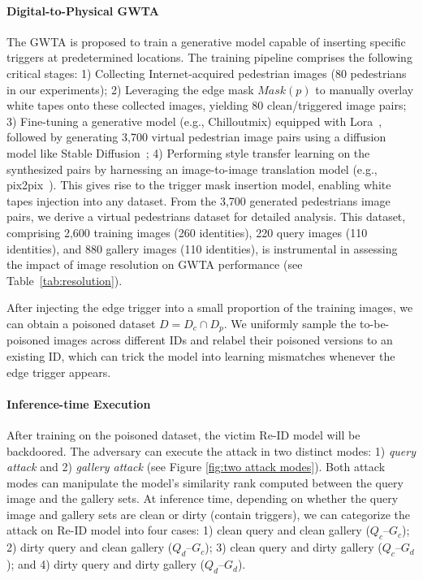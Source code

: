 \documentclass[sigconf,authordraft]{acmart}
\begin{document}
\paragraph{Digital-to-Physical GWTA} The GWTA is proposed to train a generative model capable of inserting specific triggers at predetermined locations. The training pipeline comprises the following critical stages: 1) Collecting Internet-acquired pedestrian images (80 pedestrians in our experiments); 2) Leveraging the edge mask $Mask(p)$ to manually overlay white tapes onto these collected images, yielding 80 clean/triggered image pairs; 3) Fine-tuning a generative model (e.g., Chilloutmix) equipped with Lora~\cite{hu2021lora}, followed by generating 3,700 virtual pedestrian image pairs using a diffusion model like Stable Diffusion~\cite{rombach2022high}; 4) Performing style transfer learning on the synthesized pairs by harnessing an image-to-image translation model (e.g., pix2pix~\cite{isola2017image}).
This gives rise to the trigger mask insertion model, enabling white tapes injection into any dataset. From the 3,700 generated pedestrians image pairs, we derive a virtual pedestrians dataset for detailed analysis. This dataset, comprising 2,600 training images (260 identities), 220 query images (110 identities), and 880 gallery images (110 identities), is instrumental in assessing the impact of image resolution on GWTA performance (see Table~\ref{tab:resolution}).

After injecting the edge trigger into a small proportion of the training images, we can obtain a poisoned dataset $D=D_c \cap D_p$. We uniformly sample the to-be-poisoned images across different IDs and relabel their poisoned versions to an existing ID, which can trick the model into learning mismatches whenever the edge trigger appears.

\paragraph{Inference-time Execution}
After training on the poisoned dataset, the victim Re-ID model will be backdoored. The adversary can execute the attack in two distinct modes: 1) \emph{query attack} and 2) \emph{gallery attack} (see Figure \ref{fig:two attack modes}). 
Both attack modes can manipulate the model's similarity rank computed between the query image and the gallery sets. At inference time, depending on whether the query image and gallery sets are clean or dirty (contain triggers), we can categorize the attack on Re-ID model into four cases:
1) clean query and clean gallery ($Q_{c}$--$G_{c}$); 2) dirty query and clean gallery ($Q_{d}$--$G_{c}$); 3) clean query and dirty gallery ($Q_{c}$--$G_{d}$); and 4) dirty query and dirty gallery ($Q_{d}$--$G_{d}$).
\end{document}

